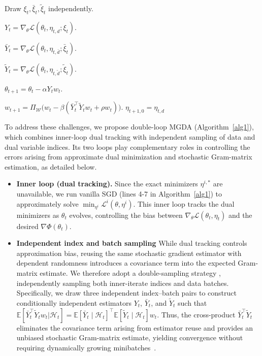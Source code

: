 \documentclass[twoside]{article} %
\theoremstyle{plain}
\theoremstyle{definition}
\theoremstyle{remark}
\newcommand{\fL}{\mathcal{L}}
\newcommand{\calH}{\mathcal{H}}
\begin{document}
\begin{algorithm}[t]
\begin{algorithmic}[1]
    \STATE Draw
    $\xi_t,\bar\xi_t,\tilde\xi_t$ independently.

    \STATE
    $Y_t=\nabla_{\theta}\fL(
    \theta_t,\eta_{t,d};\xi_t)$.

    \STATE
    $\bar Y_t=\nabla_{\theta}\fL(
    \theta_t,\eta_{t,\bar d};\bar\xi_t)$.

    \STATE
    $\widetilde Y_t=\nabla_{\theta}\fL(
    \theta_t,\eta_{t,\tilde d};\tilde\xi_t)$.

    \STATE
    $\theta_{t+1}=\theta_t-\alpha Y_t w_t$.

    \STATE
    $\displaystyle
    w_{t+1}=\Pi_{\mathcal W}\!\big(
    w_t-\beta(
    \bar Y_t^\top\widetilde Y_t w_t+\rho w_t
    )\big)$.
    \STATE $\eta_{t+1,0} = \eta_{t,d}$
\ENDFOR
\end{algorithmic}
\vspace{0.3em}
\end{algorithm}
To address these challenges, we propose double-loop MGDA (Algorithm~\ref{alg1}), which combines inner-loop dual tracking with independent sampling of data and dual variable indices. Its two loops play complementary roles in controlling the errors arising from approximate dual minimization and stochastic Gram-matrix estimation, as detailed below.
\begin{itemize}[leftmargin = *, topsep = 0pt]
    \item \textbf{Inner loop (dual tracking).} Since the exact minimizers \(\eta^{i,*}\) are unavailable, we run vanilla SGD \citep{lanSGD} (lines 4-7 in Algorithm~\ref{alg1}) to approximately solve \(\min_{\eta^i} \fL^i(\theta,\eta^i)\). This inner loop tracks the dual minimizers as \(\theta_t\) evolves, controlling the bias between \(\nabla_\theta \fL(\theta_t,\eta_t)\) and the desired \(\nabla \Phi(\theta_t)\).

    \item \textbf{Independent index and batch sampling} While dual tracking controls approximation bias, reusing the same stochastic gradient estimator with dependent randomness introduces a covariance term into the
    expected Gram-matrix estimate. We therefore adopt a double-sampling strategy \citep{SDMkaiyiJi,MODO}, independently sampling both inner-iterate indices and data batches. Specifically, we draw three independent index--batch pairs to
    construct conditionally independent estimators $Y_t$, $\bar Y_t$, and
    $\tilde Y_t$ such that
    $\mathbb{E}[\bar{Y}_t^{\top}\tilde{Y}_tw_t|\calH_t]=\mathbb E[\bar Y_t\mid\mathcal H_t]^\top
\mathbb E[\tilde Y_t\mid\mathcal H_t]w_t$. Thus, the cross-product $\bar Y_t^\top\tilde Y_t$ eliminates the covariance
    term arising from estimator reuse and provides an unbiased stochastic Gram-matrix estimate, yielding convergence without requiring dynamically growing minibatches~\citep{stochasticMGDA}.
\end{itemize}
\end{document}
